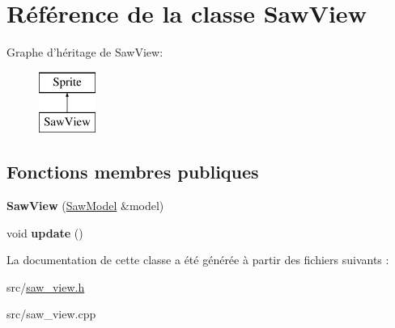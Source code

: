 \hypertarget{class_saw_view}{\section{Référence de la classe Saw\+View}
\label{class_saw_view}
}
Graphe d'héritage de Saw\+View\+:\begin{figure}[H]
\begin{center}
\leavevmode
\includegraphics[height=2.000000cm]{class_saw_view}
\end{center}
\end{figure}
\subsection*{Fonctions membres publiques}
\begin{DoxyCompactItemize}
\item 
\hypertarget{class_saw_view_a180d226da69198ab8940d296cdec4993}{{\bfseries Saw\+View} (\hyperlink{class_saw_model}{Saw\+Model} \&model)}\label{class_saw_view_a180d226da69198ab8940d296cdec4993}

\item 
\hypertarget{class_saw_view_ac0038fe2c58d989bc9f7201b21cebc28}{void {\bfseries update} ()}\label{class_saw_view_ac0038fe2c58d989bc9f7201b21cebc28}

\end{DoxyCompactItemize}


La documentation de cette classe a été générée à partir des fichiers suivants \+:\begin{DoxyCompactItemize}
\item 
src/\hyperlink{saw__view_8h}{saw\+\_\+view.\+h}\item 
src/saw\+\_\+view.\+cpp\end{DoxyCompactItemize}
